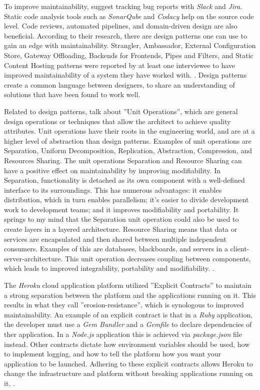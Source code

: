 \documentclass[utf8,english]{gradu3}
\begin{document}
To improve maintainability, \textcite[7]{Vale2022} suggest tracking bug reports
with \textit{Slack} and \textit{Jira}. Static code analysis tools such as
\textit{SonarQube} and \textit{Codacy} help on the source code level. Code
reviews, automated pipelines, and domain-driven design are also beneficial.
According to their research, there are design patterns one can use to gain an
edge with maintainability. Strangler, Ambassador, External Configuration Store,
Gateway Offloading, Backends for Frontends, Pipes and Filters, and Static Content
Hosting patterns were reported by at least one interviewee to have improved
maintainability of a system they have worked with. \parencite[4-6]{Vale2022}.
Design patterns create a common language between designers, to share an
understanding of solutions that have been found to work well.

Related to design patterns, \textcite{Bass1998} talk about ''Unit Operations'',
which are general design operations or techniques that allow the
architect to achieve quality attributes. Unit operations have their roots in the
engineering world, and are at a higher level of abstraction than design
patterns. Examples of unit operations are Separation, Uniform Decomposition,
Replication, Abstraction, Compression, and Resources Sharing. The unit operations
Separation and Resource Sharing can have a positive effect on maintainability
by improving modifiability. In Separation, functionality is
detached as its own component with a well-defined interface to its surroundings.
This has numerous advantages: it enables distribution, which in turn enables
parallelism; it's easier to divide development work to development teams; and it
improves modifiability and portability. It springs to my mind that the Separation
unit operation could also be used to create layers in a layered architecture.
Resource Sharing means that data or services are encapsulated and then
shared between multiple independent consumers. Examples of this are databases,
blackboards, and servers in a client-server-architecture. This unit operation
decreases coupling between components, which leads to improved integrability,
portability and modifiability. \parencite[123-126]{Bass1998}.

The \textit{Heroku} cloud application platform \parencite{Heroku2011} utilized
''Explicit Contracts'' to maintain a strong separation between the platform
and the applications running on it. This results in what they call
''erosion-resistance'', which is synologous to improved maintainability. An
example of an explicit contract is that in a \textit{Ruby} application, the
developer must use a \textit{Gem Bundler} and a \textit{Gemfile} to declare
dependencies of ther application. In a \textit{Node.js} application this is
achieved via \textit{package.json} file instead. Other contracts dictate how
environment variables should be used, how to implement logging, and how to tell
the platform how you want your application to be launched. Adhering to these
explicit contracts allows Heroku to change the infrastructure and platform
without breaking applications running on it. \parencite{Heroku2011}.
\end{document}
